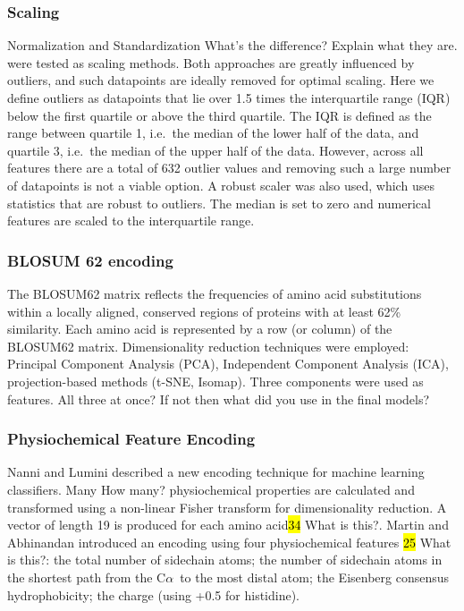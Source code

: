 \documentclass[12pt]{article}
\newcommand{\ca}{\mbox{C$\alpha$}}
\newcommand{\lilian}[1]{ {\color{red}{\bfseries Lilian:} #1}}
\newcommand{\highlight}[1]{\hl{#1}}
\let\shortcite\cite
\begin{document}
\subsubsection{Scaling}
Normalization and Standardization\lilian{What's the difference? Explain what they are.} were tested as scaling methods. Both
approaches are greatly influenced by outliers, and such datapoints are
ideally removed for optimal scaling. Here we define outliers as
datapoints that lie over 1.5 times the interquartile range (IQR) below
the first quartile or above the third quartile. The IQR is defined as
the range between quartile 1, i.e.\ the median of the lower half of the
data, and quartile 3, i.e.\ the median of the upper half of the
data. However, across all features there are a total of 632 outlier
values and removing such a large number of datapoints is not a viable
option. A robust scaler\cite{XXXX} was also used, which uses statistics that are
robust to outliers. The median is set to zero and numerical features
are scaled to the interquartile range.

\subsubsection{BLOSUM 62 encoding}
The BLOSUM62 matrix reflects the frequencies of amino acid
substitutions within a locally aligned, conserved regions of proteins
with at least 62\% similarity. Each amino acid is represented by a row
(or column) of the BLOSUM62 matrix. Dimensionality reduction
techniques were employed: Principal Component Analysis (PCA),
Independent Component Analysis (ICA), projection-based methods (t-SNE,
Isomap). Three components were used as features.\lilian{All three at once?
  If not then what did you use in the final models?}

\subsubsection{Physiochemical Feature Encoding}
Nanni and Lumini\shortcite{XXXX} described a new encoding technique
for machine learning classifiers. Many\lilian{How many?}
physiochemical properties are calculated and transformed using a
non-linear Fisher transform for dimensionality reduction.  A vector of
length 19 is produced for each amino acid\highlight{34}\lilian{What is this?}. 
Martin and Abhinandan\shortcite{XXXX} introduced an encoding using
four physiochemical features \highlight{25}\lilian{What is this?}:
the total number of sidechain atoms; the
number of sidechain atoms in the shortest path from the \ca\ to the most
distal atom; the Eisenberg consensus
hydrophobicity\cite{Eisenberg1982}; the charge (using +0.5 for histidine).
\end{document}
